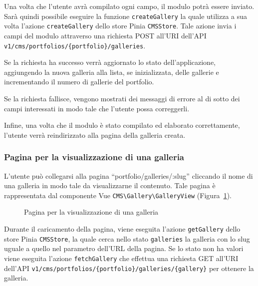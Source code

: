 Una volta che l'utente avr\`a compilato ogni campo, il modulo potr\`a essere inviato. Sar\`a quindi possibile eseguire la funzione \verb|createGallery| la quale utilizza a sua volta l'azione \verb|createGallery| dello store Pinia \verb|CMSStore|. Tale azione invia i campi del modulo attraverso una richiesta POST all'URI dell'API \verb|v1/cms/portfolios/{portfolio}/galleries|.

Se la richiesta ha successo verr\`a aggiornato lo stato dell'applicazione, aggiungendo la nuova galleria alla lista, se inizializzata, delle gallerie e incrementando il numero di gallerie del portfolio.

Se la richiesta fallisce, vengono mostrati dei messaggi di errore al di sotto dei campi interessati in modo tale che l'utente possa correggerli.

Infine, una volta che il modulo \`e stato compilato ed elaborato correttamente, l'utente verr\`a reindirizzato alla pagina della galleria creata.

\subsubsection{Pagina per la visualizzazione di una galleria}
L'utente pu\`o collegarsi alla pagina ``portfolio/galleries/:slug'' cliccando il nome di una galleria in modo tale da visualizzarne il contenuto. Tale pagina \`e rappresentata dal componente Vue \verb|CMS\Gallery\GalleryView| (Figura~\ref{fig:cms-g-view}).

\begin{figure}[htbp]
	\centering
	\fboxsep=0.5pt
	\fboxrule=0.5pt
	\caption{Pagina per la visualizzazione di una galleria}
	\label{fig:cms-g-view}
\end{figure}

Durante il caricamento della pagina, viene eseguita l'azione \verb|getGallery| dello store Pinia \verb|CMSStore|, la quale cerca nello stato \verb|galleries| la galleria con lo slug uguale a quello nel parametro dell'URL della pagina. Se lo stato non ha valori viene eseguita l'azione \verb|fetchGallery| che effettua una richiesta GET all'URI dell'API \verb|v1/cms/portfolios/{portfolio}/galleries/{gallery}| per ottenere la galleria.

